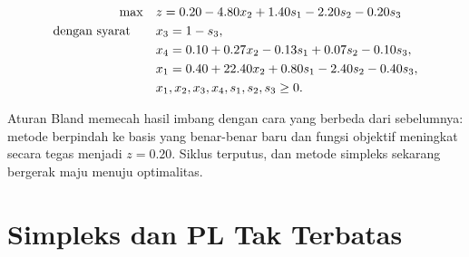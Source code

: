 \[
\begin{aligned}
\max \quad & z = 0.20 - 4.80x_2 + 1.40s_1 - 2.20s_2 - 0.20s_3 \\
\mbox{dengan syarat}\quad \quad 
& x_3 = 1 - s_3, \\
& x_4 = 0.10 + 0.27x_2 - 0.13s_1 + 0.07s_2 - 0.10s_3, \\
& x_1 = 0.40 + 22.40x_2 + 0.80s_1 - 2.40s_2 - 0.40s_3, \\
& x_1, x_2, x_3, x_4, s_1, s_2, s_3 \geq 0.
\end{aligned}
\]

\noindent Aturan Bland memecah hasil imbang dengan cara yang berbeda dari sebelumnya: metode berpindah ke basis yang benar-benar baru dan fungsi objektif meningkat secara tegas menjadi $z=0.20$. Siklus terputus, dan metode simpleks sekarang bergerak maju menuju optimalitas.

\section{Simpleks dan PL Tak Terbatas}

